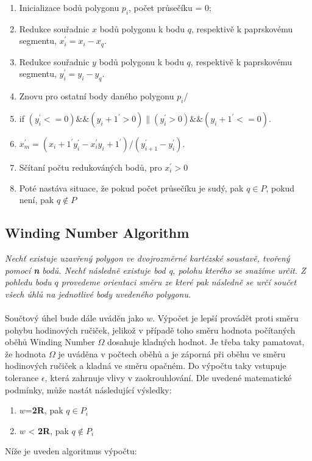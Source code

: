 \documentclass{article}
\begin{document}
\begin{enumerate} 

\item Inicializace bodů polygonu $p_i$, počet průsečíku = 0;

\item Redukce souřadnic $x$ bodů polygonu k bodu $q$,  respektivě k paprskovému segmentu, $x_i^{'} = x_i - x_q$. 

\item  Redukce souřadnic $y$ bodů polygonu k bodu $q$, respektivě k paprskovému segmentu, $y_i^{'} = y_i - y_q$. 

\item Znovu pro ostatní body daného polygonu $p_i$/ 

\item if $(y_{i}^{'} <= 0)\&\&(y_i+1^{'} > 0)\|(y_{i}^{'} > 0)\&\&(y_i+1^{'} <= 0)$. 

\item $x_m^{'} = (x_i+1^{'}y_{i}^{'}-x_{i}^{'}y_i+1^{'})/(y_{i+1}^{'}-y_{i}^{'})$. 

\item Sčítaní počtu redukováných bodů, pro $x_i^{'} > 0$  


\item Poté nastáva situace, že pokud počet průsečíku je sudý, pak $q \in P$, pokud není, pak  $q \notin P$ 

\end{enumerate} 
\clearpage
\newpage 

\subsection{Winding Number Algorithm} 
\textsl{Nechť existuje uzavřený polygon ve dvojrozměrné kartézské soustavě, tvořený pomocí \textbf n bodů. Nechť následně existuje bod q, polohu kterého se snažíme určit. Z pohledu bodu $q$ provedeme orientaci směru ze které pak následně se určí součet všech úhlů na jednotlivé body uvedeného polygonu.}
\\
\\
Součtový úhel bude dále uváděn jako $w$. Výpočet je lepší provádět proti směru pohybu hodinových ručiček, jelikož v případě toho směru hodnota počítaných oběhů Winding Number $\Omega$  dosahuje kladných hodnot. Je třeba taky pamatovat, že hodnota $\Omega$ je uváděna v počtech oběhů a je záporná při oběhu ve směru 
hodinových ručiček a kladná ve směru opačném. Do výpočtu taky vstupuje tolerance $\epsilon$, která zahrnuje vlivy v zaokrouhlování. Dle uvedené matematické podmínky, může nastát následující výsledky:
\begin{enumerate} 
\item $w$=\textbf {2R}, pak $q \in P_i$ 
\item  $w$ < \textbf {2R}, pak $q {\not \in} P_i$
\end{enumerate}
 Níže je uveden algoritmus výpočtu: 
\end{document}

